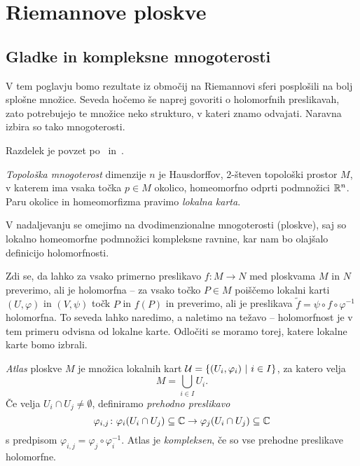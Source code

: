 \section{Riemannove ploskve}

\subsection{Gladke in kompleksne mnogoterosti}

V tem poglavju bomo rezultate iz območij na Riemannovi sferi
posplošili na bolj splošne množice. Seveda hočemo še naprej
govoriti o holomorfnih preslikavah, zato potrebujejo te množice
neko strukturo, v kateri znamo odvajati. Naravna izbira so tako
mnogoterosti.

Razdelek je povzet po~\cite[razdelek 1.2]{Forstneric}
in~\cite[poglavja I.1, III.7 ter II.5]{Farkas_Kra_1980}.

\begin{definicija}
\emph{Topološka mnogoterost} dimenzije $n$ je Hausdorffov, 2-števen
topološki prostor $M$, v katerem ima vsaka točka $p \in M$ okolico,
homeomorfno odprti podmnožici $\mathbb{R}^n$. Paru okolice in homeomorfizma
pravimo \emph{lokalna karta}.
\end{definicija}

V nadaljevanju se omejimo na dvodimenzionalne mnogoterosti
(ploskve), saj so lokalno homeomorfne podmnožici kompleksne
ravnine, kar nam bo olajšalo definicijo holomorfnosti.

Zdi se, da lahko za vsako primerno preslikavo $f \colon M \to N$
med ploskvama $M$ in $N$ preverimo, ali je holomorfna -- za vsako
točko $P \in M$ poiščemo lokalni karti $(U, \varphi)$ in
$(V, \psi)$ točk $P$ in $f(P)$ in preverimo, ali je preslikava
$\tilde{f} = \psi \circ f \circ \varphi^{-1}$ holomorfna. To seveda
lahko naredimo, a naletimo na težavo -- holomorfnost je v tem
primeru odvisna od lokalne karte. Odločiti se moramo torej, katere
lokalne karte bomo izbrali.

\begin{definicija}
\emph{Atlas} ploskve $M$ je množica lokalnih kart
$\mathcal{U} = \left\{(U_i, \varphi_i)~\middle\vert~i \in I\right\}$, za katero velja
\[
M = \bigcup_{i \in I} U_i.
\]
Če velja
$U_i \cap U_j \ne \emptyset$, definiramo \emph{prehodno preslikavo}
\[
\varphi_{i,j} \colon
\varphi_i(U_i \cap U_j) \subseteq \mathbb{C} \to
\varphi_j(U_i \cap U_j) \subseteq \mathbb{C}
\]
s predpisom
$\varphi_{i,j} = \varphi_j \circ \varphi_i^{-1}$. Atlas je
\emph{kompleksen}, če so vse prehodne preslikave holomorfne.
\end{definicija}

